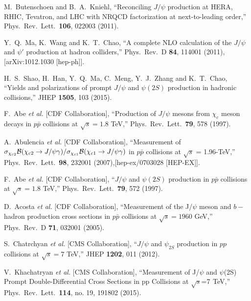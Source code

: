 \documentclass[aps,prc,preprint,superscriptaddress,showpacs,showkeys,amsmath]{revtex4-1}
\begin{document}
\begin{thebibliography}{100}
  M.~Butenschoen and B.~A.~Kniehl,
  ``Reconciling $J/\psi$ production at HERA, RHIC, Tevatron, and LHC with NRQCD factorization at next-to-leading order,''
  Phys.\ Rev.\ Lett.\  {\bf 106}, 022003 (2011). 
 

  Y.~Q.~Ma, K.~Wang and K.~T.~Chao,
  ``A complete NLO calculation of the $J/\psi$ and $\psi'$ production at hadron colliders,''
  Phys.\ Rev.\ D {\bf 84}, 114001 (2011),
  [arXiv:1012.1030 [hep-ph]].


  H.~S.~Shao, H.~Han, Y.~Q.~Ma, C.~Meng, Y.~J.~Zhang and K.~T.~Chao,
  ``Yields and polarizations of prompt $J/\psi$ and $\psi(2S)$ production in hadronic collisions,''
  JHEP {\bf 1505}, 103 (2015).




  F.~Abe {\it et al.} [CDF Collaboration],
  ``Production of $J/\psi$ mesons from $\chi_c$ meson decays in $p\bar{p}$ collisions at $\sqrt{s} = 1.8$ TeV,''
  Phys.\ Rev.\ Lett.\  {\bf 79}, 578 (1997).


  A.~Abulencia {\it et al.} [CDF Collaboration],
  ``Measurement of $\sigma_{\chi_{c2}}{\cal B}(\chi_{c2} \to J/\psi \gamma)/\sigma_{\chi_{c1}} {\cal B}(\chi_{c1} \to J/\psi \gamma)$ 
  in $p \bar{p}$ collisions at $\sqrt{s}$ = 1.96-TeV,''
  Phys.\ Rev.\ Lett.\  {\bf 98}, 232001 (2007),[hep-ex/0703028 [HEP-EX]].


  F.~Abe {\it et al.} [CDF Collaboration],
  ``$J/\psi$ and $\psi(2S)$ production in $p\bar{p}$ collisions at $\sqrt{s} = 1.8$ TeV,''
  Phys.\ Rev.\ Lett.\  {\bf 79}, 572 (1997).
  

  D.~Acosta {\it et al.}  [CDF Collaboration],
  ``Measurement of the J/$\psi$ meson and $b-$hadron production cross sections in $p\bar{p}$ collisions at $\sqrt{s} = 1960$ GeV,''
  Phys.\ Rev.\ D {\bf 71}, 032001 (2005).



  S.~Chatrchyan {\it et al.} [CMS Collaboration],
  ``$J/\psi$ and $\psi_{2S}$ production in $pp$ collisions at $\sqrt{s}=7$ TeV,''
  JHEP {\bf 1202}, 011 (2012).
  

  V.~Khachatryan {\it et al.} [CMS Collaboration],
  ``Measurement of J/$\psi$ and $\psi$(2S) Prompt Double-Differential Cross Sections in pp Collisions at $\sqrt{s}$=7  TeV,''
  Phys.\ Rev.\ Lett.\  {\bf 114}, no. 19, 191802 (2015).


\end{thebibliography}
\end{document}
